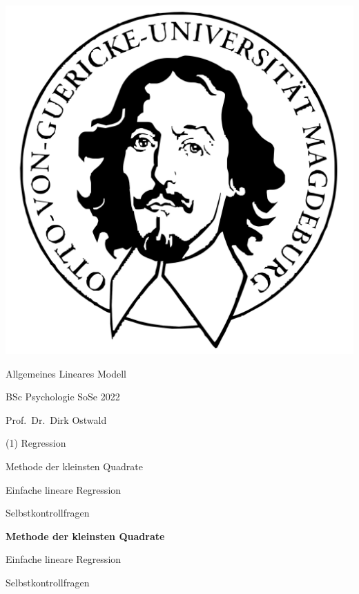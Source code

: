 \documentclass[
  8pt,
  ignorenonframetext,
]{beamer}
\author{}
\date{\vspace{-2.5em}}
\begin{document}
\begin{frame}[plain]{}
\protect\hypertarget{section}{}
\center

\begin{center}\includegraphics[width=0.2\linewidth]{1_Abbildungen/alm_1_otto} \end{center}

\vspace{2mm}

\huge

Allgemeines Lineares Modell \vspace{6mm}

\large

BSc Psychologie SoSe 2022

\vspace{6mm}
\normalsize

Prof.~Dr.~Dirk Ostwald
\end{frame}

\begin{frame}[plain]{}
\protect\hypertarget{section-1}{}
\center
\huge
\vfill

\noindent (1) Regression \vfill
\end{frame}

\begin{frame}{}
\protect\hypertarget{section-2}{}
\vfill
\large

Methode der kleinsten Quadrate

Einfache lineare Regression

Selbstkontrollfragen

\vfill
\end{frame}

\begin{frame}{}
\protect\hypertarget{section-3}{}
\vfill
\large

\textbf{Methode der kleinsten Quadrate}

Einfache lineare Regression

Selbstkontrollfragen

\vfill
\end{frame}
\end{document}
